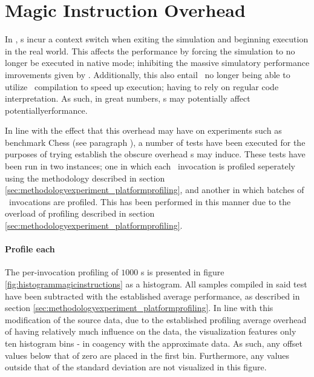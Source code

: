 \section{Magic Instruction Overhead}
\label{sec:results_magicinstructionoverhead}
In \dvttermsimics , \dvttermmagicinstruction s incur a context switch when exiting the simulation and beginning execution in the real world.
This affects the performance by forcing the simulation to no longer be executed in native mode; inhibiting the massive simulatory performance imrovements given by \dvttermhostvirtualizationextensions .
Additionally, this also entail \dvttermsimics\ no longer being able to utilize \dvttermjit\ compilation to speed up execution; having to rely on regular code interpretation.
As such, in great numbers, \dvttermmagicinstruction s may potentially affect potentiallyerformance. 

In line with the effect that this overhead may have on experiments such as benchmark Chess (see paragraph ), a number of tests have been executed for the purposes of trying establish the obscure overhead \dvttermmagicinstruction s may induce.
These tests have been run in two instances; one in which each \dvttermmagicinstruction\ invocation is profiled seperately using the methodology described in section \ref{sec:methodologyexperiment_platformprofiling}, and another in which batches of \dvttermmagicinstruction\ invocations are profiled.
This has been performed in this manner due to the overload of profiling described in section \ref{sec:methodologyexperiment_platformprofiling}.

\paragraph{Profile each}
\label{par:results_magicinstructionoverhead_profileeach}
The per-invocation profiling of $1000$ \dvttermmagicinstruction s is presented in figure \ref{fig:histogrammagicinstructions} as a histogram.
All samples compiled in said test have been subtracted with the established average performance, as described in section \ref{sec:methodologyexperiment_platformprofiling}.
In line with this modification of the source data, due to the established profiling average overhead of  having relatively much influence on the data, the visualization features only ten histogram bins - in coagency with the approximate data.
As such, any offset values below that of zero are placed in the first bin.
Furthermore, any values outside that of the standard deviation are not visualized in this figure.

